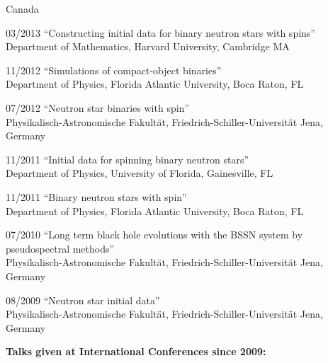 \documentclass[11pt]{article}
\begin{document}
\begin{list}{}{\leftmargin=5em =1.5em \rightmargin=-8em =7em}
		 Canada
\item[03/2013]	``Constructing initial data for binary neutron stars with 
		spins''\\
		{Department of Mathematics},
		{Harvard University, Cambridge MA}
\item[11/2012]	``Simulations of compact-object binaries''\\
		{Department of Physics},
		{Florida Atlantic University, Boca Raton, FL}
\item[07/2012]	``Neutron star binaries with spin''\\
		{Physikalisch-Astronomische Fakult\"at},
		{Friedrich-Schiller-Universit\"at Jena, Germany}
\item[11/2011]	``Initial data for spinning binary neutron stars''\\
		{Department of Physics},
		{University of Florida, Gainesville, FL}
\item[11/2011]	``Binary neutron stars with spin''\\
		{Department of Physics},
		{Florida Atlantic University, Boca Raton, FL}
\item[07/2010]	``Long term black hole evolutions with the BSSN system by
		pseudospectral methods''\\
		{Physikalisch-Astronomische Fakult\"at},
		{Friedrich-Schiller-Universit\"at Jena, Germany}
\item[08/2009]	``Neutron star initial data''\\
		{Physikalisch-Astronomische Fakult\"at},
		{Friedrich-Schiller-Universit\"at Jena, Germany}
\end{list}


\bigskip

{\bf Talks given at International Conferences since 2009:}
\end{document}
